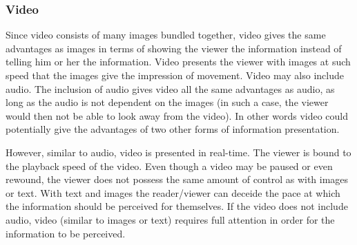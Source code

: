 \subsubsection{Video}
Since video consists of many images bundled together, video gives the same advantages as images in terms of showing the viewer the information instead of telling him or her the information. Video presents the viewer with images at such speed that the images give the impression of movement. Video may also include audio. The inclusion of audio gives video all the same advantages as audio, as long as the audio is not dependent on the images (in such a case, the viewer would then not be able to look away from the video). In other words video could potentially give the advantages of two other forms of information presentation.

However, similar to audio, video is presented in real-time. The viewer is bound to the playback speed of the video. Even though a video may be paused or even rewound, the viewer does not possess the same amount of control as with images or text. With text and images the reader/viewer can deceide the pace at which the information should be perceived for themselves. If the video does not include audio, video (similar to images or text) requires full attention in order for the information to be perceived.